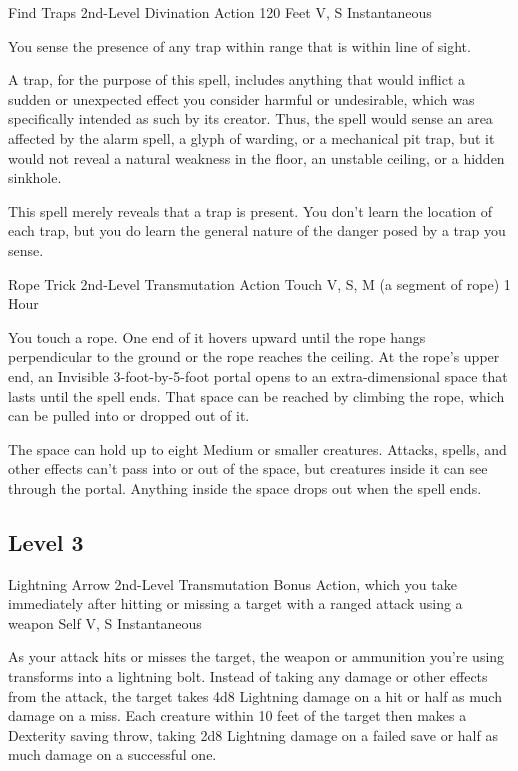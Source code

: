 \documentclass[letterpaper,openany,oneside,twocolumn]{book}
\begin{document}
\DndSpellHeader
  {Find Traps}
  {2nd-Level Divination}
  {Action}
  {120 Feet}
  {V, S}
  {Instantaneous}

You sense the presence of any trap within range that is within line of sight.

A trap, for the purpose of this spell, includes anything that would inflict a sudden or unexpected effect you consider harmful or undesirable, which was specifically intended as such by its creator. Thus, the spell would sense an area affected by the alarm spell, a glyph of warding, or a mechanical pit trap, but it would not reveal a natural weakness in the floor, an unstable ceiling, or a hidden sinkhole.

This spell merely reveals that a trap is present. You don't learn the location of each trap, but you do learn the general nature of the danger posed by a trap you sense.

\DndSpellHeader
  {Rope Trick}
  {2nd-Level Transmutation}
  {Action}
  {Touch}
  {V, S, M (a segment of rope)}
  {1 Hour}

You touch a rope. One end of it hovers upward until the rope hangs perpendicular to the ground or the rope reaches the ceiling. At the rope's upper end, an Invisible 3-foot-by-5-foot portal opens to an extra-dimensional space that lasts until the spell ends. That space can be reached by climbing the rope, which can be pulled into or dropped out of it.

The space can hold up to eight Medium or smaller creatures. Attacks, spells, and other effects can't pass into or out of the space, but creatures inside it can see through the portal. Anything inside the space drops out when the spell ends.

\subsection*{Level 3}

\DndSpellHeader
  {Lightning Arrow}
  {2nd-Level Transmutation}
  {Bonus Action, which you take immediately after hitting or missing a target with a ranged attack using a weapon}
  {Self}
  {V, S}
  {Instantaneous}

As your attack hits or misses the target, the weapon or ammunition you're using transforms into a lightning bolt. Instead of taking any damage or other effects from the attack, the target takes 4d8 Lightning damage on a hit or half as much damage on a miss. Each creature within 10 feet of the target then makes a Dexterity saving throw, taking 2d8 Lightning damage on a failed save or half as much damage on a successful one.
\end{document}
